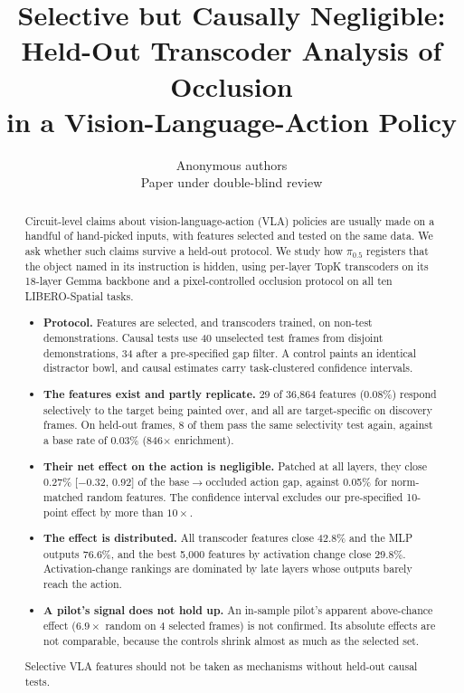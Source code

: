 \documentclass{article} %
\title{Selective but Causally Negligible:\\Held-Out Transcoder Analysis of Occlusion\\in a Vision-Language-Action Policy}
\author{Anonymous authors\\
Paper under double-blind review}
\newcommand{\pifive}{$\pi_{0.5}$}
\begin{document}
\maketitle

\begin{abstract}
Circuit-level claims about vision-language-action (VLA) policies are usually made on a handful of hand-picked inputs, with features selected and tested on the same data. We ask whether such claims survive a held-out protocol. We study how \pifive{} registers that the object named in its instruction is hidden, using per-layer TopK transcoders on its 18-layer Gemma backbone and a pixel-controlled occlusion protocol on all ten LIBERO-Spatial tasks.
\begin{itemize}[leftmargin=*,itemsep=0pt,topsep=2pt]
  \item \textbf{Protocol.} Features are selected, and transcoders trained, on non-test demonstrations. Causal tests use 40 unselected test frames from disjoint demonstrations, 34 after a pre-specified gap filter. A control paints an identical distractor bowl, and causal estimates carry task-clustered confidence intervals.
  \item \textbf{The features exist and partly replicate.} 29 of 36,864 features (0.08\%) respond selectively to the target being painted over, and all are target-specific on discovery frames. On held-out frames, 8 of them pass the same selectivity test again, against a base rate of 0.03\% (846$\times$ enrichment).
  \item \textbf{Their net effect on the action is negligible.} Patched at all layers, they close 0.27\% [$-$0.32, 0.92] of the base$\rightarrow$occluded action gap, against 0.05\% for norm-matched random features. The confidence interval excludes our pre-specified 10-point effect by more than $10\times$.
  \item \textbf{The effect is distributed.} All transcoder features close 42.8\% and the MLP outputs 76.6\%, and the best 5,000 features by activation change close 29.8\%. Activation-change rankings are dominated by late layers whose outputs barely reach the action.
  \item \textbf{A pilot's signal does not hold up.} An in-sample pilot's apparent above-chance effect ($6.9\times$ random on 4 selected frames) is not confirmed. Its absolute effects are not comparable, because the controls shrink almost as much as the selected set.
\end{itemize}
Selective VLA features should not be taken as mechanisms without held-out causal tests.
\end{abstract}
\end{document}
